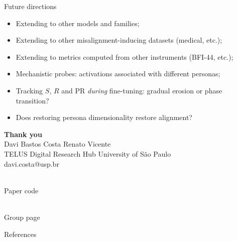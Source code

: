 \documentclass[aspectratio=169]{beamer}
\begin{document}
\begin{frame}{Future directions}
  \vspace{0.6em}
  \begin{itemize}
    \item Extending to other models and families;\hfill{\checkmark}
    \item Extending to other misalignment-inducing datasets (medical, etc.); \hfill{\checkmark}
    \item Extending to metrics computed from other instruments (BFI-44, etc.);\hfill{\checkmark}
    \item Mechanistic probes: activations associated with different personas;\hfill{\LEFTcircle}
    \item Tracking $S$, $R$ and PR \emph{during} fine-tuning: gradual erosion or phase transition?
    \item Does restoring persona dimensionality restore alignment?
  \end{itemize}
\end{frame}

\begin{frame}[plain]
  \vfill\centering
  {\Large\bfseries Thank you}\\[1.2em]
  {\normalsize Davi Bastos Costa \quad Renato Vicente}\\[0.4em]
  {\small\color{black!50} TELUS Digital Research Hub \quad University of S\~{a}o Paulo}\\[0.6em]
  {\small\color{black!45} davi.costa@usp.br}\\[1.2em]
  \begin{minipage}[t]{0.28\textwidth}
    \centering
    {\setlength{\fboxsep}{0.15em}\colorbox{white}{\color{black}}}\\[0.4em]
    {\scriptsize\color{black!50} Paper code}
  \end{minipage}\hspace{2em}
  \begin{minipage}[t]{0.28\textwidth}
    \centering
    {\setlength{\fboxsep}{0.15em}\colorbox{white}{\color{black}}}\\[0.4em]
    {\scriptsize\color{black!50} Group page}
  \end{minipage}
  \vfill
\end{frame}

\begin{frame}[allowframebreaks]{References}
  
  
\end{frame}
\end{document}
